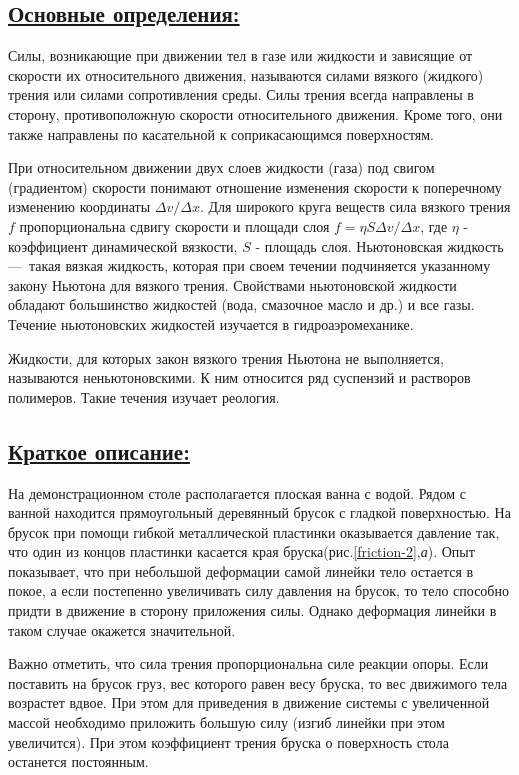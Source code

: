 \documentclass[14pt,a4paper,oneside]{extarticle}	%
\begin{document}
	\newpage	
	\subsection*{\underline{Основные определения:}}
	
	Силы, возникающие при движении тел в газе или жидкости 
	и зависящие от скорости их относительного движения, называются 
	силами вязкого (жидкого) трения или силами сопротивления среды. 
	Силы трения всегда направлены в сторону, противоположную скорости относительного 
	движения.
	Кроме того, они также направлены по касательной к соприкасающимся поверхностям.
		
	При относительном движении двух слоев жидкости (газа) под свигом (градиентом) скорости понимают отношение изменения скорости к поперечному изменению координаты $\Delta v / \Delta x $. Для широкого круга веществ сила вязкого трения $f$ пропорциональна сдвигу скорости и площади слоя $f = \eta S \Delta v / \Delta x$, где $\eta $ - коэффициент динамической вязкости, $S$ - площадь слоя.
	Ньютоновская жидкость — такая вязкая жидкость, которая при своем течении подчиняется указанному закону Ньютона для вязкого трения.
	Свойствами ньютоновской жидкости обладают большинство жидкостей (вода, смазочное масло и др.) и все газы. 
	Течение ньютоновских жидкостей изучается в гидроаэромеханике. 
	
	Жидкости, для которых закон вязкого трения Ньютона не выполняется, называются неньютоновскими.
	К ним относится ряд суспензий и растворов полимеров. 
	Такие течения изучает реология.

	\newpage	
	\subsection*{\underline{Краткое описание:}}
	
	На демонстрационном столе располагается плоская ванна с водой.
	Рядом с ванной находится прямоугольный деревянный брусок с гладкой поверхностью.
	На брусок при помощи гибкой металлической пластинки оказывается давление так, что один из концов пластинки касается края бруска(рис.\ref{friction-2},\textit{а}).
	Опыт показывает, что при небольшой деформации самой линейки тело остается в покое, 
	а если постепенно увеличивать силу давления на брусок, то тело способно придти в движение в сторону приложения силы.
	Однако деформация линейки в таком случае окажется значительной.
		
	Важно отметить, что сила трения пропорциональна силе реакции опоры.
	Если поставить на брусок груз, вес которого равен весу бруска, то вес движимого тела возрастет вдвое.
	При этом для приведения в движение системы с увеличенной массой необходимо приложить большую силу (изгиб линейки при этом увеличится).
	При этом коэффициент трения бруска о поверхность стола останется постоянным.
	
\end{document}

